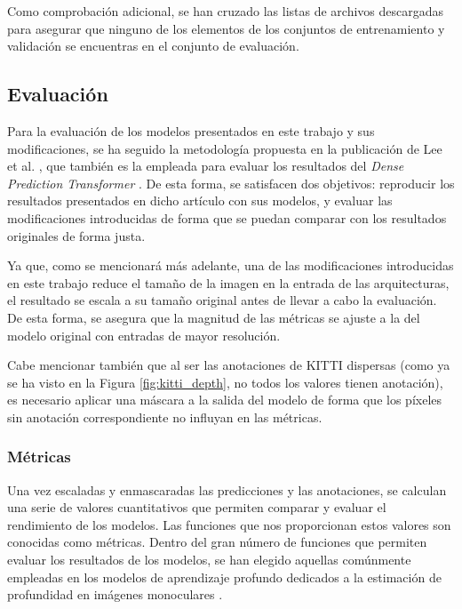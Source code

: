 Como comprobación adicional, se han cruzado las listas de archivos descargadas para asegurar que ninguno de los elementos de los conjuntos de entrenamiento y validación se encuentras en el conjunto de evaluación.



\subsection{Evaluación}
Para la evaluación de los modelos presentados en este trabajo y sus modificaciones, se ha seguido la metodología propuesta en la publicación de Lee et al. \cite{bts}, que también es la empleada para evaluar los resultados del \textit{Dense Prediction Transformer} \cite{visiontransformersDPT}. De esta forma, se satisfacen dos objetivos: reproducir los resultados presentados en dicho artículo con sus modelos, y evaluar las modificaciones introducidas de forma que se puedan comparar con los resultados originales de forma justa. 

Ya que, como se mencionará más adelante, una de las modificaciones introducidas en este trabajo reduce el tamaño de la imagen en la entrada de las arquitecturas, el resultado se escala a su tamaño original antes de llevar a cabo la evaluación. De esta forma, se asegura que la magnitud de las métricas se ajuste a la del modelo original con entradas de mayor resolución. 

Cabe mencionar también que al ser las anotaciones de KITTI dispersas (como ya se ha visto en la Figura \ref{fig:kitti_depth}, no todos los valores tienen anotación), es necesario aplicar una máscara a la salida del modelo de forma que los píxeles sin anotación correspondiente no influyan en las métricas.

\subsubsection{Métricas}
Una vez escaladas y enmascaradas las predicciones y las anotaciones, se calculan una serie de valores cuantitativos que permiten comparar y evaluar el rendimiento de los modelos. Las funciones que nos proporcionan estos valores son conocidas como métricas. Dentro del gran número de funciones que permiten evaluar los resultados de los modelos, se han elegido aquellas comúnmente empleadas en los modelos de aprendizaje profundo dedicados a la estimación de profundidad en imágenes monoculares \cite{visiontransformersDPT,midas-intel,eigen-multi-scale,bts,DORN,bhat2020adabins,evaluation-cnn-depth-estimation, depth-estimation-metrics}.

